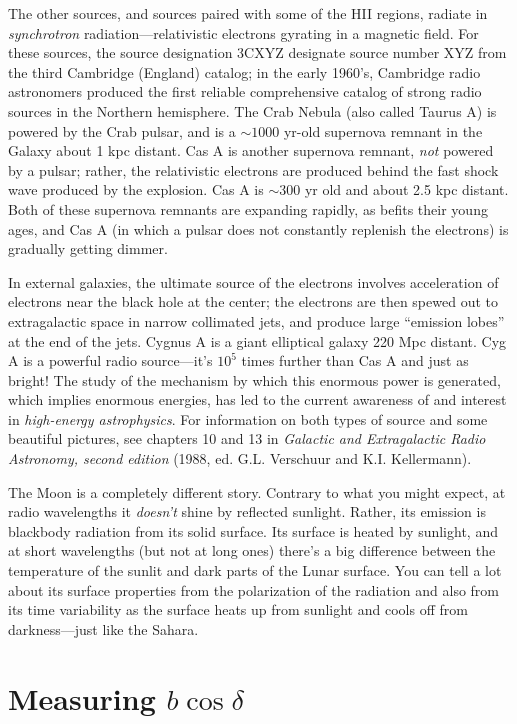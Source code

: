 \documentclass[11pt,preprint]{aastex}
\begin{document}
The other sources, and sources paired with some of the HII regions,
radiate in {\it synchrotron} radiation---relativistic electrons gyrating
in a magnetic field.  For these sources, the source designation 3CXYZ
designate source number XYZ from the third Cambridge (England) catalog;
in the early 1960's, Cambridge radio astronomers produced the first
reliable comprehensive catalog of strong radio sources in the Northern
hemisphere.  The Crab Nebula (also called Taurus A) is powered by the
Crab pulsar, and is a $\sim 1000$ yr-old supernova remnant in the Galaxy
about 1 kpc distant. Cas A is another supernova remnant, {\it not}
powered by a pulsar; rather, the relativistic electrons are produced
behind the fast shock wave produced by the explosion.  Cas A is $\sim
300$ yr old and about 2.5 kpc distant.  Both of these supernova remnants
are expanding rapidly, as befits their young ages, and Cas A (in which a
pulsar does not constantly replenish the electrons) is gradually getting
dimmer.

In external galaxies, the ultimate source of the
electrons involves acceleration of electrons near the black hole at the
center; the electrons are then spewed out to extragalactic space in
narrow collimated jets, and produce large ``emission lobes'' at the end
of the jets.  Cygnus A is a giant
elliptical galaxy 220 Mpc distant.  Cyg A is a powerful radio
source---it's $10^5$ times further than Cas A and just as bright! The
study of the mechanism by which this enormous power is generated, which
implies enormous energies, has led to the current awareness of and
interest in {\it high-energy astrophysics}.
For information on both types of source and some beautiful
pictures, see chapters 10 and 13 in {\it Galactic and Extragalactic
Radio Astronomy, second edition} (1988, ed.  G.L.  Verschuur and K.I. 
Kellermann). 

	The Moon is a completely different story. Contrary to what you
might expect, at radio wavelengths it {\it doesn't} shine by reflected
sunlight. Rather, its emission is blackbody radiation from its solid
surface. Its surface is heated by sunlight, and at short wavelengths
(but not at long ones) there's a big difference between the temperature
of the sunlit and dark parts of the Lunar surface. You can tell a lot
about its surface properties from the polarization of the radiation and
also from its time variability as the surface heats up from sunlight and
cools off from darkness---just like the Sahara.

\section {Measuring $b \cos \delta$} \label{declinations}
\end{document}
